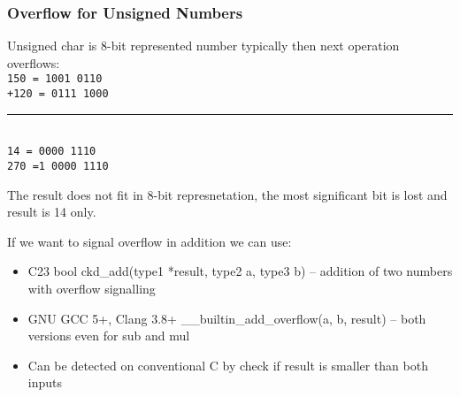 \documentclass{beamer}
\begin{document}
\begin{frame}
\frametitle{Overflow for Unsigned Numbers}


Unsigned char is 8-bit represented number typically then next operation overflows:\\
\texttt{\phantom{x}150 = \phantom{x}1001 0110}\\
\texttt{+120 = \phantom{x}0111 1000}\vspace{-6pt}\\
\rule[0pt]{3.6cm}{0.4pt}\\
\texttt{\phantom{xx}14 = \phantom{x}0000 1110}\\
\texttt{\phantom{x}270 =1 0000 1110}

The result does not fit in 8-bit represnetation, the most significant bit is lost and result is 14 only.

If we want to signal overflow in addition we can use:
\begin{itemize}
\item C23 bool ckd\_add(type1 *result, type2 a, type3 b) -- addition of two numbers with overflow signalling
\item GNU GCC 5+, Clang 3.8+ \_\_builtin\_add\_overflow(a, b, result) -- both versions even for sub and mul
\item Can be detected on conventional C by check if result is smaller than both inputs
\end{itemize}
\end{frame}
\end{document}
